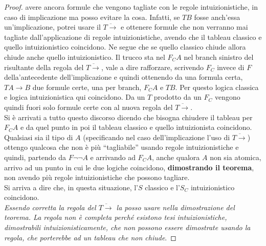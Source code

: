 \documentclass[a4paper,12pt, oneside]{book}
\begin{document}
\begin{proof}
  avere 
  ancora formule che vengono tagliate con le regole intuizionistiche, in caso di
  implicazione ma posso evitare la cosa. Infatti, se $TB$ fosse anch'essa
  un'implicazione, potrei usare il $\overline{T\to}$ e ottenere formule che non
  verranno mai tagliate dall'applicazione di regole intuizionistiche, avendo che
  il tableau classico e quello intuizionistico coincidono. Ne segue che se
  quello classico chiude allora chiude anche quello intuizionistico. Il trucco
  sta nel $F_CA$ nel branch sinistro del risultante della regola del
  $\overline{T\to}$, vale a dire rafforzare, scrivendo $F_C$ invece di $F$
  della'antecedente dell'implicazione e quindi ottenendo da una formula certa,
  $TA\to B$ due formule certe, una per branch, $F_CA$ e $TB$. Per questo logica
  classica e logica intuizionistica qui coincidono. Da un $T$ prodotto da un
  $F_C$ vengono quindi fuori solo formule certe con al nuova regola del
  $\overline{T\to}$. \\
  Si è arrivati a tutto questo discorso dicendo che bisogna chiudere il tableau
  per $F_CA$ e da quel punto in poi il tableau classico e quello intuizionista
  coincidono. Qualsiasi sia il tipo di $A$ (specificando nel caso
  dell'implicazione l'uso di $\overline{T\to}$) ottengo qualcosa che non è più
  ``tagliabile'' usando regole intuizionistiche e quindi, partendo da $F\neg
  \neg A$ e arrivando ad $F_CA$, anche qualora $A$ non sia atomica, arrivo ad
  un punto in cui le due logiche coincidono, \textbf{dimostrando il teorema},
  non avendo più regole intuizionistiche che possono tagliare.\\
  Si arriva a dire che, in questa situazione, l'$S$ classico e l'$S_C$
  intuizionistico coincidono.\\
  \emph{Essendo corretta la regola del $\overline{T\to}$ la posso usare
    nella dimostrazione del teorema. La regola non è completa perché esistono
    tesi intuizionistiche, dimostrabili intuizionisticamente, che non possono
    essere dimostrate usando la regola, che porterebbe ad un tableau che non
    chiude}. 
\end{proof}
\end{document}
